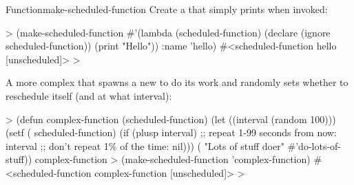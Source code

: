 \documentclass[10pt,twoside,english,pdftex]{article}
\begin{document}
\begin{functiondoc}{Function}{make-scheduled-function}{ 
    }
\fnexamples
%
Create a  that simply prints 
when invoked:
%
\W\supp
\begin{example}
  > (make-scheduled-function 
      #'(lambda (scheduled-function)
          (declare (ignore scheduled-function))
          (print "Hello"))
      :name 'hello)
  #<scheduled-function hello [unscheduled]>
  >
\end{example}

%
%
%
A more complex  that spawns a new  to
do its work and randomly sets whether to reschedule itself (and at what
interval):
%
\W\supp
\begin{example}
  > (defun complex-function (scheduled-function)
      (let ((interval (random 100)))
        (setf ( scheduled-function)
              (if (plusp interval) 
                  ;; repeat 1-99 seconds from now:
                  interval
                  ;; don't repeat 1\% of the time:
                  nil)))
      ( "Lots of stuff doer" #'do-lots-of-stuff))
  complex-function
  > (make-scheduled-function 'complex-function)
  #<scheduled-function complex-function [unscheduled]>
  >
\end{example}

\end{functiondoc}

\end{document}
